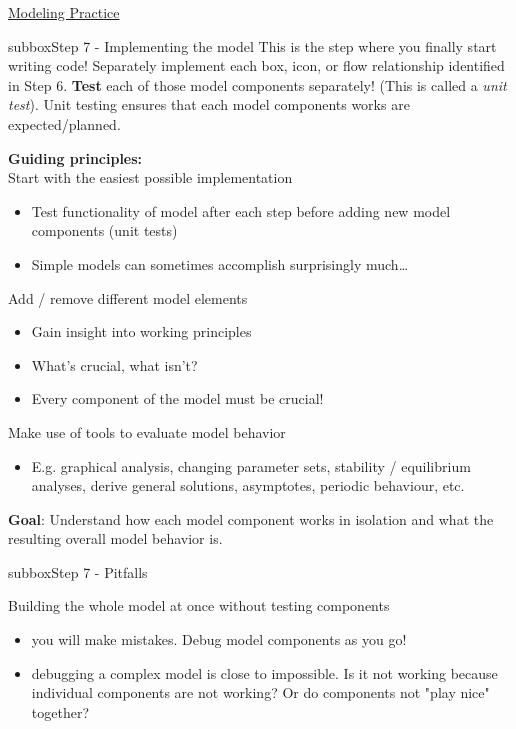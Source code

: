 \begin{textbox}{\href{https://compneuro.neuromatch.io/projects/modelingsteps/ModelingSteps_5through10.html}{Modeling Practice  } }

\begin{subbox}{subbox}{Step 7 - Implementing the model
}
\scriptsize
This is the step where you finally start writing code! Separately implement each box, icon, or flow relationship identified in Step 6. \textbf{Test} each of those model components separately! (This is called a \textit{unit test}). Unit testing ensures that each model components works are expected/planned. 

\textbf{Guiding principles:}\\
Start with the easiest possible implementation
\begin{itemize}
    \item 
   Test functionality of model after each step before adding new model components (unit tests)
   \item Simple models can sometimes accomplish surprisingly much…
  \end{itemize}

 Add / remove different model elements
\begin{itemize}
    \item Gain insight into working principles
    \item What’s crucial, what isn’t?
    \item Every component of the model must be crucial!
  \end{itemize}

 Make use of tools to evaluate model behavior
  \begin{itemize}
    \item E.g. graphical analysis, changing parameter sets, stability / equilibrium analyses, derive general solutions, asymptotes, periodic behaviour, etc.
\end{itemize}


\textbf{Goal}: Understand how each model component works in isolation and what the resulting overall model behavior is.

  \end{subbox}
\begin{subbox}{subbox}{Step 7 - Pitfalls }
\scriptsize

Building the whole model at once without testing components
  \begin{itemize}
    \item you will make mistakes. Debug model components as you go!
   \item debugging a complex model is close to impossible. Is it not working because individual components are not working? Or do components not "play nice" together?\end{itemize}



\end{subbox}
\end{textbox}
